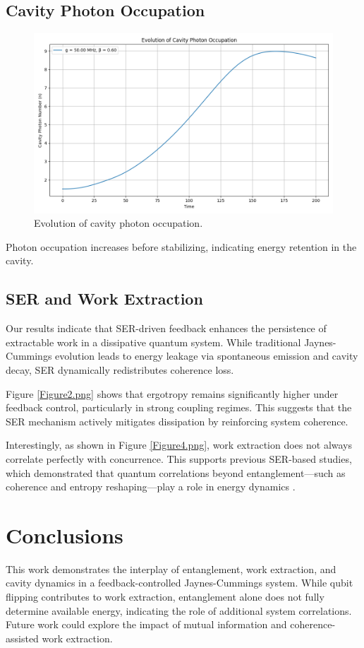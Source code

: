 \documentclass[a4paper,12pt]{article}
\begin{document}
\subsection{Cavity Photon Occupation}
\begin{figure}[h]
\centering
\includegraphics[width=0.7\linewidth]{Figure3.png}
\caption{Evolution of cavity photon occupation.}
\label{fig:photons}
\end{figure}

Photon occupation increases before stabilizing, indicating energy retention in the cavity.

\subsection{SER and Work Extraction}
Our results indicate that SER-driven feedback enhances the persistence of extractable work in a dissipative quantum system. While traditional Jaynes-Cummings evolution leads to energy leakage via spontaneous emission and cavity decay, SER dynamically redistributes coherence loss. 

Figure \ref{Figure2.png} shows that ergotropy remains significantly higher under feedback control, particularly in strong coupling regimes. This suggests that the SER mechanism actively mitigates dissipation by reinforcing system coherence.

Interestingly, as shown in Figure \ref{Figure4.png}, work extraction does not always correlate perfectly with concurrence. This supports previous SER-based studies, which demonstrated that quantum correlations beyond entanglement—such as coherence and entropy reshaping—play a role in energy dynamics \cite{wallace2025ser}.

\section{Conclusions}
This work demonstrates the interplay of entanglement, work extraction, and cavity dynamics in a feedback-controlled 
Jaynes-Cummings system. While qubit flipping contributes to work extraction, entanglement alone does not fully determine 
available energy, indicating the role of additional system correlations. Future work could explore the impact of mutual 
information and coherence-assisted work extraction.
\end{document}
